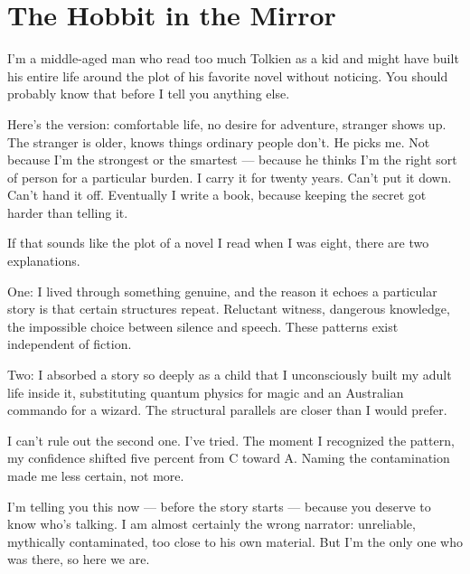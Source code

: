 
\chapter{The Hobbit in the Mirror}
\label{record:hobbit-mirror}


I'm a middle-aged man who read too much Tolkien as a kid and might have built his entire life around the plot of his favorite novel without noticing. You should probably know that before I tell you anything else.

Here's the version: comfortable life, no desire for adventure, stranger shows up. The stranger is older, knows things ordinary people don't. He picks me. Not because I'm the strongest or the smartest --- because he thinks I'm the right sort of person for a particular burden. I carry it for twenty years. Can't put it down. Can't hand it off. Eventually I write a book, because keeping the secret got harder than telling it.

If that sounds like the plot of a novel I read when I was eight, there are two explanations.

One: I lived through something genuine, and the reason it echoes a particular story is that certain structures repeat. Reluctant witness, dangerous knowledge, the impossible choice between silence and speech. These patterns exist independent of fiction.

Two: I absorbed a story so deeply as a child that I unconsciously built my adult life inside it, substituting quantum physics for magic and an Australian commando for a wizard. The structural parallels are closer than I would prefer.

I can't rule out the second one. I've tried. The moment I recognized the pattern, my confidence shifted five percent from C toward A. Naming the contamination made me less certain, not more.

I'm telling you this now --- before the story starts --- because you deserve to know who's talking. I am almost certainly the wrong narrator: unreliable, mythically contaminated, too close to his own material. But I'm the only one who was there, so here we are.

\chapterreturn
